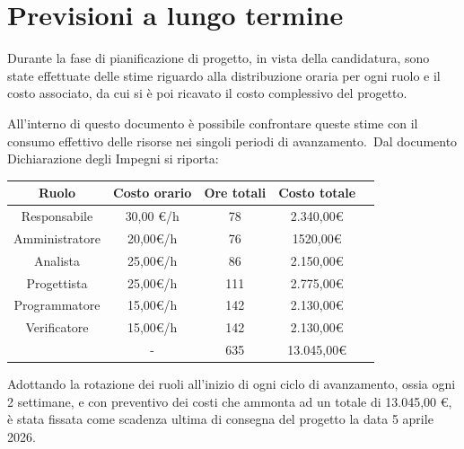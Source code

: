 \documentclass[10pt, letterpaper]{article}
\begin{document}
\section{Previsioni a lungo termine}
Durante la fase di pianificazione di progetto, in vista della candidatura, sono state effettuate delle stime riguardo alla distribuzione
oraria per ogni ruolo e il costo associato, da cui si è poi ricavato il costo complessivo del progetto.

All'interno di questo documento è possibile confrontare queste stime con il consumo effettivo delle risorse nei
singoli periodi di avanzamento.\
Dal documento Dichiarazione degli Impegni si riporta:
\begin{center}
    \begin{tabular}{|c|c|c|c|c|}
        \hline
        \rowcolor{lightgray} \textbf{Ruolo}    & \textbf{Costo orario} & \textbf{Ore totali} & \textbf{Costo totale}
        \\
        \hline
        Responsabile                           & 30,00 \euro/h         & 78                  & 2.340,00\euro         \\
        \hline
        Amministratore                         & 20,00\euro/h          & 76                  & 1520,00\euro          \\
        \hline
        Analista                               & 25,00\euro/h          & 86                  & 2.150,00\euro         \\
        \hline
        Progettista                            & 25,00\euro/h          & 111                 & 2.775,00\euro         \\
        \hline
        Programmatore                          & 15,00\euro/h          & 142                 & 2.130,00\euro         \\
        \hline
        Verificatore                           & 15,00\euro/h          & 142                 & 2.130,00\euro         \\
        \hline
        \cellcolor{lightgray}{\textbf{Totale}} & -                     & 635                 & 13.045,00\euro        \\
        \hline
    \end{tabular}
\end{center}
Adottando la rotazione dei ruoli all'inizio di ogni ciclo di avanzamento, ossia ogni 2 settimane, e con
preventivo dei costi che ammonta ad un totale di 13.045,00 \euro, è stata fissata come scadenza ultima di consegna del
progetto la data 5 aprile 2026.
\end{document}
